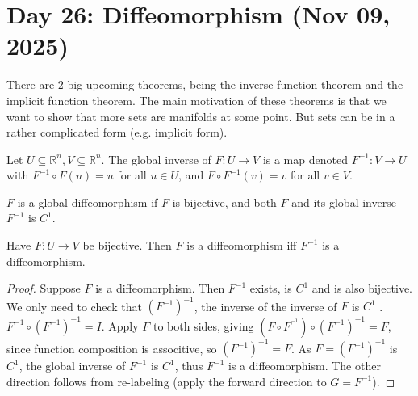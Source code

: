 \section{Day 26: Diffeomorphism (Nov 09, 2025)}

 There are 2 big upcoming theorems, being the inverse function theorem and the implicit function theorem. The main motivation of these theorems is that we want to show that more sets are manifolds at some point. But sets can be in a rather complicated form (e.g. implicit form).

\begin{definition}
    Let $U \subseteq \mathbb{R}^n, V \subseteq \mathbb{R}^n$. The global inverse of $F : U \to V$ is a map denoted $F ^{-1} : V \to U$ with $F ^{-1} \circ F (u) = u$ for all $u \in U$, and $F \circ F ^{-1} (v) = v$ for all $v \in V$. 
\end{definition}

\begin{definition}
    $F$ is a global diffeomorphism if $F$ is bijective, and both $F$ and its global inverse $F ^{-1}$ is $C^1$.
\end{definition}

\begin{simplethm}[Symmetry]
    Have $F : U \to V$ be bijective. Then $F$ is a diffeomorphism iff $F^{-1}$ is a diffeomorphism. 
\end{simplethm}

\begin{proof}
    Suppose $F$ is a diffeomorphism. Then $F^{-1}$ exists, is $C^1$ and is also bijective. We only need to check that $(F ^{-1}) ^{-1}$, the inverse of the inverse of $F$ is $C^1$ . $F^{-1} \circ (F^{-1})^{-1} = I$. Apply $F$ to both sides, giving $(F \circ F^{^{-1}}) \circ (F^{-1})^{-1} = F$, since function composition is associtive, so $(F^{-1})^{-1} = F$. As $F = (F^{-1})^{-1}$ is $C^1$, the global inverse of $F^{-1}$ is $C^1$, thus $F^{-1}$ is a diffeomorphism. The other direction follows from re-labeling (apply the forward direction to $G = F^{-1}$).
\end{proof}

